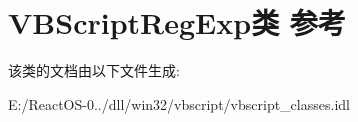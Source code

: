\hypertarget{class_v_b_script_reg_exp}{}\section{V\+B\+Script\+Reg\+Exp类 参考}
\label{class_v_b_script_reg_exp}


该类的文档由以下文件生成\+:\begin{DoxyCompactItemize}
\item 
E\+:/\+React\+O\+S-\/0../dll/win32/vbscript/vbscript\+\_\+classes.\+idl\end{DoxyCompactItemize}
